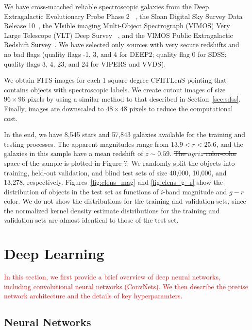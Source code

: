 \documentclass[fleqn,usenatbib]{mnras}
\newcommand{\changed}[1]{\textcolor{red}{#1}}
\begin{document}
We have cross-matched reliable spectroscopic galaxies from
the Deep Extragalactic Evolutionary Probe Phase 2~
\citep[DEEP2;][]{davis2003science,newman2013deep2},
the Sloan Digital Sky Survey Data Release 10~\citep[SDSS-DR10]{alam2015eleventh},
the VIsible imaging Multi-Object Spectrograph (VIMOS)
Very Large Telescope (VLT) Deep Survey~
\citep[VVDS;][]{le2005vimos,garilli2008vimos}, and
the VIMOS Public Extragalactic Redshift
Survey~\citep[VIPERS;][]{garilli2014vimos}.
We have selected only sources with very secure
redshifts and no bad flags (quality flags -1, 3, and 4 for DEEP2;
quality flag 0 for SDSS; quality flags 3, 4, 23, and 24 for VIPERS
and VVDS).

We obtain FITS images for each 1 square degree CFHTLenS pointing
that contains objects with spectroscopic labels.
We create cutout images of size $96\times96$ pixels by using a similar method
to that described in Section~\ref{sec:sdss}.
Finally, images are downscaled to $48\times48$ pixels
to reduce the computational cost.

In the end, we have 8,545 stars and 57,843 galaxies available
for the training and testing processes.
The apparent magnitudes range from $13.9 < r < 25.6$,
and the galaxies in this sample have a mean redshift of $z \sim 0.59$.
\sout{ The $ugriz$ color-color space of the sample is plotted in Figure ?.}
We randomly split the objects into training, held-out validation, and
blind test sets of size 40,000, 10,000, and 13,278, respectively.
Figures~\ref{fig:clens_mag} and \ref{fig:clens_g_r} show the distribution
of objects in the test set as functions of $i$-band magnitude and $g-r$ color.
We do not show the distributions for the training and validation sets,
since the normalized kernel density estimate distributions for the training
and validation sets are almost identical to those of the test set.

\section{Deep Learning}
  \label{sec:deep_learning}

\changed{
In this section, we first provide a brief overview of deep neural networks,
including convolutional neural networks (ConvNets).
We then describe the precise network architecture and the details of key
hyperparamters.
}

\subsection{Neural Networks}
\end{document}
